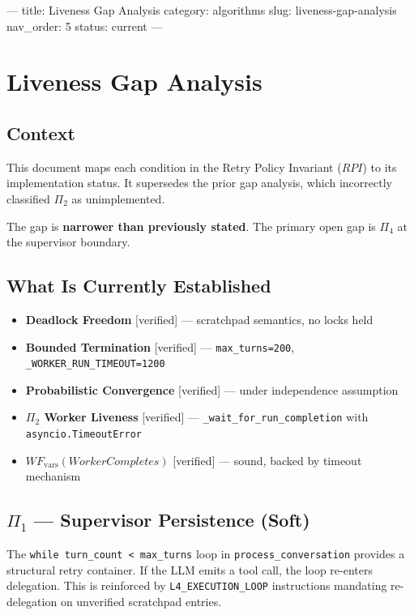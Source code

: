 ---
title: Liveness Gap Analysis
category: algorithms
slug: liveness-gap-analysis
nav_order: 5
status: current
---

\section{Liveness Gap Analysis}

\subsection*{Context}

This document maps each condition in the Retry Policy Invariant ($RPI$) to
its implementation status. It supersedes the prior gap analysis, which
incorrectly classified $\Pi_2$ as unimplemented.

The gap is \textbf{narrower than previously stated}. The primary open gap
is $\Pi_4$ at the supervisor boundary.

\subsection*{What Is Currently Established}

\begin{itemize}
  \item \textbf{Deadlock Freedom} [verified] — scratchpad semantics, no locks held
  \item \textbf{Bounded Termination} [verified] — \texttt{max\_turns=200}, \texttt{\_WORKER\_RUN\_TIMEOUT=1200}
  \item \textbf{Probabilistic Convergence} [verified] — under independence assumption
  \item \textbf{$\Pi_2$ Worker Liveness} [verified] — \texttt{\_wait\_for\_run\_completion} with \texttt{asyncio.TimeoutError}
  \item \textbf{$WF_{\text{vars}}(WorkerCompletes)$} [verified] — sound, backed by timeout mechanism
\end{itemize}

\subsection*{$\Pi_1$ — Supervisor Persistence (Soft)}

The \texttt{while turn\_count < max\_turns} loop in \texttt{process\_conversation}
provides a structural retry container. If the LLM emits a tool call, the loop
re-enters delegation. This is reinforced by \texttt{L4\_EXECUTION\_LOOP} instructions
mandating re-delegation on unverified scratchpad entries.


